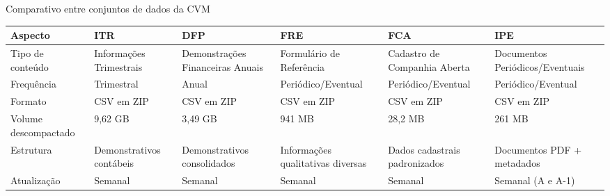\begin{board}[!htb]
	\centering
	\caption{Comparativo entre conjuntos de dados da CVM}
	\label{tab:comparativo_cvm}
	\begin{varwidth}{\linewidth}
		\scriptsize
		\begin{tabularx}{\textwidth}{|X|X|X|X|X|X|}
			\hline
			\textbf{Aspecto}     & \textbf{ITR}                      & \textbf{DFP}                       & \textbf{FRE}                                    & \textbf{FCA}                       & \textbf{IPE}                                         \\ \hline
			
			Tipo de conteúdo    & Informações Trimestrais         & Demonstrações Financeiras Anuais & Formulário de Referência                      & Cadastro de Companhia Aberta       & Documentos Periódicos/Eventuais                     \\ \hline
			
			Frequência          & Trimestral                        & Anual                              & Periódico/Eventual                             & Periódico/Eventual                & Periódico/Eventual                                  \\ \hline
			
			Formato              & CSV em ZIP                        & CSV em ZIP                         & CSV em ZIP                                      & CSV em ZIP                         & CSV em ZIP                                           \\ \hline
			
			Volume descompactado & 9,62 GB                           & 3,49 GB                            & 941 MB                                          & 28,2 MB                            & 261 MB                                               \\ \hline
			
			Estrutura            & Demonstrativos contábeis         & Demonstrativos consolidados        & Informações qualitativas diversas             & Dados cadastrais padronizados      & Documentos PDF + metadados                           \\ \hline
			
			Atualização        & Semanal                           & Semanal                            & Semanal                                         & Semanal                            & Semanal (A e A-1)                                    \\ \hline
			

\end{tabularx}
\end{varwidth}
\end{board}
